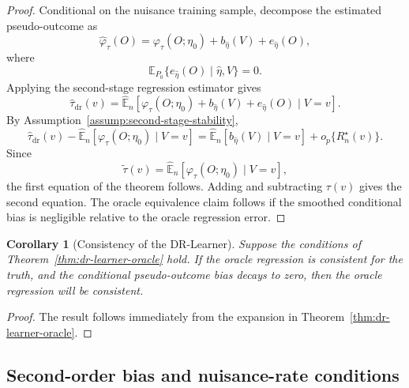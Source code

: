 \documentclass[11pt]{article}
\newtheorem{corollary}[theorem]{Corollary}
\begin{document}
\begin{proof}
Conditional on the nuisance training sample, decompose the estimated
pseudo-outcome as
\[
  \widehat\varphi_\tau(O)
  =
  \varphi_\tau(O;\eta_0)
  +
  b_{\widehat\eta}(V)
  +
  e_{\widehat\eta}(O),
\]
where
\[
  \mathbb{E}_{P_0}
  \{e_{\widehat\eta}(O)\mid \widehat\eta,V\}
  =
  0.
\]
Applying the second-stage regression estimator gives
\[
  \widehat\tau_{\mathrm{dr}}(v)
  =
  \widehat{\mathbb E}_n
  \left[
    \varphi_\tau(O;\eta_0)
    +
    b_{\widehat\eta}(V)
    +
    e_{\widehat\eta}(O)
    \mid V=v
  \right].
\]
By Assumption~\ref{assump:second-stage-stability},
\[
  \widehat\tau_{\mathrm{dr}}(v)
  -
  \widehat{\mathbb E}_n
  \left[
    \varphi_\tau(O;\eta_0)
    \mid V=v
  \right]
  =
  \widehat{\mathbb E}_n
  \left[
    b_{\widehat\eta}(V)
    \mid V=v
  \right]
  +
  o_p\{R_n^\star(v)\}.
\]
Since
\[
  \widetilde\tau(v)
  =
  \widehat{\mathbb E}_n
  \left[
    \varphi_\tau(O;\eta_0)
    \mid V=v
  \right],
\]
the first equation of the theorem follows. Adding and subtracting \(\tau(v)\) gives the 
second equation. The oracle equivalence claim follows if the smoothed conditional bias
is negligible relative to the oracle regression error.
\end{proof}

\begin{corollary}[Consistency of the DR-Learner]
\label{cor:dr-learner-consistency}
Suppose the conditions of Theorem~\ref{thm:dr-learner-oracle} hold. 
If the oracle regression is consistent for the truth, and the 
conditional pseudo-outcome bias 
decays to zero, then the oracle regression will be consistent. 
\end{corollary}

\begin{proof}
The result follows immediately from the expansion in
Theorem~\ref{thm:dr-learner-oracle}.
\end{proof}

\subsection{Second-order bias and nuisance-rate conditions}
\label{subsec:second-order-bias}
\end{document}
